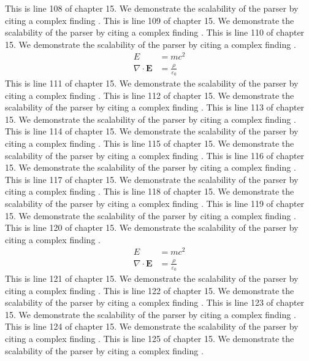 This is line 108 of chapter 15. We demonstrate the scalability of the parser by citing a complex finding \cite{ref15_108}.
This is line 109 of chapter 15. We demonstrate the scalability of the parser by citing a complex finding \cite{ref15_109}.
This is line 110 of chapter 15. We demonstrate the scalability of the parser by citing a complex finding \cite{ref15_110}.
\begin{align*}
  E &= mc^2 \\
  \nabla \cdot \mathbf{E} &= \frac{\rho}{\varepsilon_0}
\end{align*}
This is line 111 of chapter 15. We demonstrate the scalability of the parser by citing a complex finding \cite{ref15_111}.
This is line 112 of chapter 15. We demonstrate the scalability of the parser by citing a complex finding \cite{ref15_112}.
This is line 113 of chapter 15. We demonstrate the scalability of the parser by citing a complex finding \cite{ref15_113}.
This is line 114 of chapter 15. We demonstrate the scalability of the parser by citing a complex finding \cite{ref15_114}.
This is line 115 of chapter 15. We demonstrate the scalability of the parser by citing a complex finding \cite{ref15_115}.
This is line 116 of chapter 15. We demonstrate the scalability of the parser by citing a complex finding \cite{ref15_116}.
This is line 117 of chapter 15. We demonstrate the scalability of the parser by citing a complex finding \cite{ref15_117}.
This is line 118 of chapter 15. We demonstrate the scalability of the parser by citing a complex finding \cite{ref15_118}.
This is line 119 of chapter 15. We demonstrate the scalability of the parser by citing a complex finding \cite{ref15_119}.
This is line 120 of chapter 15. We demonstrate the scalability of the parser by citing a complex finding \cite{ref15_120}.
\begin{align*}
  E &= mc^2 \\
  \nabla \cdot \mathbf{E} &= \frac{\rho}{\varepsilon_0}
\end{align*}
This is line 121 of chapter 15. We demonstrate the scalability of the parser by citing a complex finding \cite{ref15_121}.
This is line 122 of chapter 15. We demonstrate the scalability of the parser by citing a complex finding \cite{ref15_122}.
This is line 123 of chapter 15. We demonstrate the scalability of the parser by citing a complex finding \cite{ref15_123}.
This is line 124 of chapter 15. We demonstrate the scalability of the parser by citing a complex finding \cite{ref15_124}.
This is line 125 of chapter 15. We demonstrate the scalability of the parser by citing a complex finding \cite{ref15_125}.
